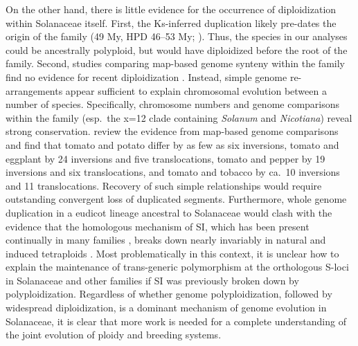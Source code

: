 On the other hand, there is little evidence for the occurrence of diploidization within Solanaceae itself.
First, the Ks-inferred duplication \citep{tomato2012} likely pre-dates the origin of the family (49 My, HPD 46--53 My; \citealt{sarkinen_2013}). 
Thus, the species in our analyses could be ancestrally polyploid, but would have diploidized before the root of the family.
Second, studies comparing map-based genome synteny within the family find no evidence for recent diploidization \citep{wu_2010a}.
Instead, simple genome re-arrangements appear sufficient to explain chromosomal evolution between a number of species. %
Specifically, chromosome numbers and genome comparisons within the family (esp.\ the x=12 clade containing \textit{Solanum} and \textit{Nicotiana}) reveal strong conservation.
\citet{wu_2010a} review the evidence from map-based genome comparisons and find that tomato and potato differ by as few as six inversions, tomato and eggplant by 24 inversions and five translocations, tomato and pepper by 19 inversions and six translocations, and tomato and tobacco by ca.\ 10 inversions and 11 translocations.
Recovery of such simple relationships would require outstanding convergent loss of duplicated segments.
%
Furthermore, whole genome duplication in a eudicot lineage ancestral to Solanaceae would clash with the evidence that the homologous mechanism of SI, which has been present continually in many families \citep{igic_2006}, breaks down nearly invariably in natural and induced tetraploids \citep{stone_2002, mcclure_2009}.
Most problematically in this context, it is unclear how to explain the maintenance of trans-generic polymorphism at the orthologous S-loci in Solanaceae and other families if SI was previously broken down by polyploidization.
%
Regardless of whether genome polyploidization, followed by widespread diploidization, is a dominant mechanism of genome evolution in Solanaceae, it is clear that more work is needed for a complete understanding of the joint evolution of ploidy and breeding systems.


